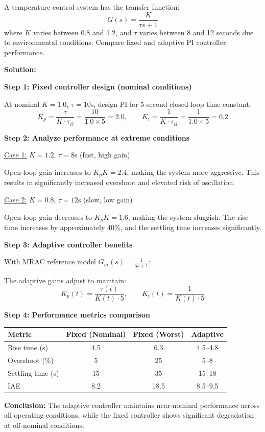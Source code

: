 \begin{example}
\label{ex:performance_comparison}
A temperature control system has the transfer function:
\begin{equation}
G(s) = \frac{K}{\tau s + 1}
\end{equation}
where $K$ varies between 0.8 and 1.2, and $\tau$ varies between 8 and 12 seconds due to environmental conditions. Compare fixed and adaptive PI controller performance.

\textbf{Solution:}

\textbf{Step 1: Fixed controller design (nominal conditions)}

At nominal $K = 1.0$, $\tau = 10$s, design PI for 5-second closed-loop time constant:
\begin{equation}
K_p = \frac{\tau}{K \cdot \tau_{cl}} = \frac{10}{1.0 \times 5} = 2.0, \qquad K_i = \frac{1}{K \cdot \tau_{cl}} = \frac{1}{1.0 \times 5} = 0.2
\end{equation}

\textbf{Step 2: Analyze performance at extreme conditions}

\underline{Case 1:} $K = 1.2$, $\tau = 8$s (fast, high gain)

Open-loop gain increases to $K_p K = 2.4$, making the system more aggressive. This results in significantly increased overshoot and elevated risk of oscillation.

\underline{Case 2:} $K = 0.8$, $\tau = 12$s (slow, low gain)

Open-loop gain decreases to $K_p K = 1.6$, making the system sluggish. The rise time increases by approximately 40\%, and the settling time increases significantly.

\textbf{Step 3: Adaptive controller benefits}

With MRAC reference model $G_m(s) = \frac{1}{5s + 1}$:

The adaptive gains adjust to maintain:
\begin{equation}
K_p(t) = \frac{\tau(t)}{K(t) \cdot 5}, \qquad K_i(t) = \frac{1}{K(t) \cdot 5}
\end{equation}

\textbf{Step 4: Performance metrics comparison}

\begin{center}
\begin{tabular}{lccc}
\toprule
\textbf{Metric} & \textbf{Fixed (Nominal)} & \textbf{Fixed (Worst)} & \textbf{Adaptive} \\
\midrule
Rise time (s) & 4.5 & 6.3 & 4.5--4.8 \\
Overshoot (\%) & 5 & 25 & 5--8 \\
Settling time (s) & 15 & 35 & 15--18 \\
IAE & 8.2 & 18.5 & 8.5--9.5 \\
\bottomrule
\end{tabular}
\end{center}

\textbf{Conclusion:} The adaptive controller maintains near-nominal performance across all operating conditions, while the fixed controller shows significant degradation at off-nominal conditions.
\end{example}

